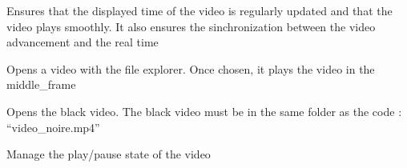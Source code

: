 \documentclass[letterpaper,10pt,english]{sphinxmanual}
\begin{document}
\begin{fulllineitems}
\begin{fulllineitems}
\label{\detokenize{general_interface:general_interface_V10.LecteurVideo.mettre_a_jour_temps_video}}
\pysigstartsignatures
{}
\pysigstopsignatures
\sphinxAtStartPar
Ensures that the displayed time of the video is regularly updated and that the video plays smoothly.
It also ensures the sinchronization between the video advancement and the real time

\end{fulllineitems}


\begin{fulllineitems}
\label{\detokenize{general_interface:general_interface_V10.LecteurVideo.ouvrir_video}}
\pysigstartsignatures
{}
\pysigstopsignatures
\sphinxAtStartPar
Opens a video with the file explorer.
Once chosen, it plays the video in the middle\_frame

\end{fulllineitems}


\begin{fulllineitems}
\label{\detokenize{general_interface:general_interface_V10.LecteurVideo.ouvrir_video_noire}}
\pysigstartsignatures
{}
\pysigstopsignatures
\sphinxAtStartPar
Opens the black video.
The black video must be in the same folder as the code : “video\_noire.mp4”

\end{fulllineitems}


\begin{fulllineitems}
\label{\detokenize{general_interface:general_interface_V10.LecteurVideo.pause_lecture}}
\pysigstartsignatures
{}
\pysigstopsignatures
\sphinxAtStartPar
Manage the play/pause state of the video


\end{fulllineitems}
\end{fulllineitems}
\end{document}
